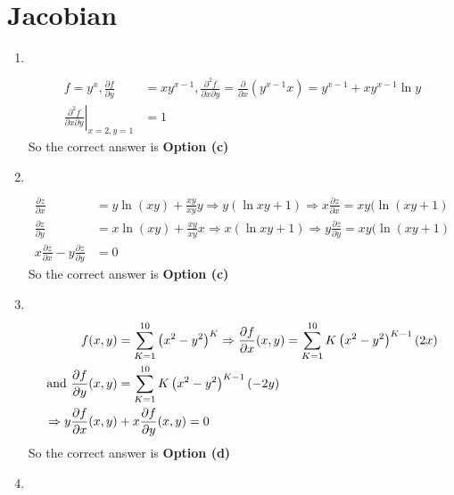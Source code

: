 \section{Jacobian}
\begin{enumerate}
		\item  $\left. \right. $
	\begin{answer}
		\begin{align*}
		f=y^{x}, \frac{\partial f}{\partial y}&=x y^{x-1}, \frac{\partial^{2} f}{\partial x \partial y}=\frac{\partial}{\partial x}\left(y^{x-1} x\right)=y^{x-1}+x y^{x-1} \ln y\\
		\left.\frac{\partial^{2} f}{\partial x \partial y}\right|_{x=2, y=1}&=1
		\end{align*}
		So the correct answer is \textbf{Option (c)}	
	\end{answer}
		\item  $\left. \right. $
	\begin{answer}
		\begin{align*}
		\frac{\partial z}{\partial x}&=y \ln (x y)+\frac{x y}{x y} y \Rightarrow y(\ln x y+1) \Rightarrow x \frac{\partial z}{\partial x}=x y(\ln (x y+1)\\
		\frac{\partial z}{\partial y}&=x \ln (x y)+\frac{x y}{x y} x \Rightarrow x(\ln x y+1) \Rightarrow y \frac{\partial z}{\partial y}=x y(\ln (x y+1)\\
		x \frac{\partial z}{\partial x}-y \frac{\partial z}{\partial y}&=0
		\end{align*}
		So the correct answer is \textbf{Option (c)}
	\end{answer}
		\item  $\left. \right. $
	\begin{answer}
		\begin{align}
		f(x, y)&=\sum_{K=1}^{10}\left(x^{2}-y^{2}\right)^{K} \Rightarrow \frac{\partial f}{\partial x}(x, y)=\sum_{K=1}^{10} K\left(x^{2}-y^{2}\right)^{K-1}(2 x)\\
		\text{and }\frac{\partial f}{\partial y}(x, y)&=\sum_{K=1}^{10} K\left(x^{2}-y^{2}\right)^{K-1}(-2 y)\\
		\Rightarrow y \frac{\partial f}{\partial x}(x, y)&+x \frac{\partial f}{\partial y}(x, y)=0\notag
		\end{align}
			So the correct answer is \textbf{Option (d)}
	\end{answer}
		\item  $\left. \right. $
	\begin{answer}
		\begin{align*}

\end{align*}
\end{answer}
\end{enumerate}

